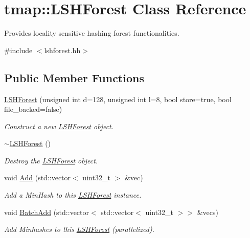 \hypertarget{classtmap_1_1LSHForest}{}\section{tmap\+:\+:L\+S\+H\+Forest Class Reference}
\label{classtmap_1_1LSHForest}


Provides locality sensitive hashing forest functionalities.  




{\ttfamily \#include $<$lshforest.\+hh$>$}

\subsection*{Public Member Functions}
\begin{DoxyCompactItemize}
\item 
\hyperlink{classtmap_1_1LSHForest_a153cb1f5090432257a17f2e9dacc32a0}{L\+S\+H\+Forest} (unsigned int d=128, unsigned int l=8, bool store=true, bool file\+\_\+backed=false)
\begin{DoxyCompactList}\small\item\em Construct a new \hyperlink{classtmap_1_1LSHForest}{L\+S\+H\+Forest} object. \end{DoxyCompactList}\item 
\mbox{\label{classtmap_1_1LSHForest_a3ab5789f702f9dac3f801c7b9d53afd4}} 
\hyperlink{classtmap_1_1LSHForest_a3ab5789f702f9dac3f801c7b9d53afd4}{$\sim$\+L\+S\+H\+Forest} ()
\begin{DoxyCompactList}\small\item\em Destroy the \hyperlink{classtmap_1_1LSHForest}{L\+S\+H\+Forest} object. \end{DoxyCompactList}\item 
void \hyperlink{classtmap_1_1LSHForest_a480d0de16bc1e4b1365bf97b9b60223a}{Add} (std\+::vector$<$ uint32\+\_\+t $>$ \&vec)
\begin{DoxyCompactList}\small\item\em Add a Min\+Hash to this \hyperlink{classtmap_1_1LSHForest}{L\+S\+H\+Forest} instance. \end{DoxyCompactList}\item 
void \hyperlink{classtmap_1_1LSHForest_ab3f73f59918a37b63662679461828cbb}{Batch\+Add} (std\+::vector$<$ std\+::vector$<$ uint32\+\_\+t $>$$>$ \&vecs)
\begin{DoxyCompactList}\small\item\em Add Minhashes to this \hyperlink{classtmap_1_1LSHForest}{L\+S\+H\+Forest} (parallelized). \end{DoxyCompactList}\item 
$$
\end{DoxyCompactItemize}
